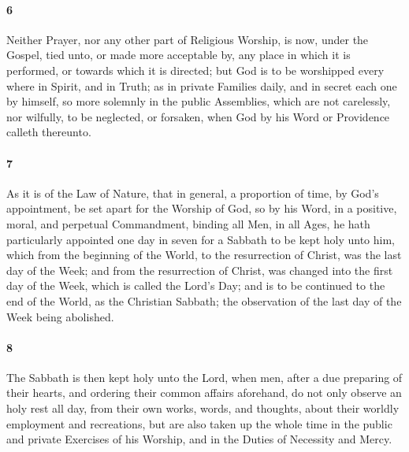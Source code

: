 \documentclass[
    paper=letterpaper,
    11pt,
    twoside,
    DIV=calc,
    openany
]{scrbook}
\newcommand{\oldgrammar}[2]{#2}
\begin{document}
\paragraph{6} %
Neither Prayer, nor any other part of Religious Worship, is now, under the Gospel, tied unto, or made more acceptable by, any place in which it is \R{}performed, or towards which it is directed; but God is to be worshipped every where in Spirit, and in Truth; as in \R{}private Families \R{}daily, and \R{}in secret each one by himself, so more solemnly in the public Assemblies, which are not carelessly, nor wilfully, to be \R{}neglected, or forsaken, when God by his Word or Providence calleth thereunto.

\footnotebegin
{}
\footnoteend

\paragraph{7} %
As it is of the Law of Nature, that in general, a proportion of time, by God’s appointment, be set apart for the Worship of God, so by his Word, in a positive, moral, and perpetual Commandment, binding all Men, in all Ages, he hath particularly appointed one day in seven for a \R{}Sabbath to be kept holy unto him, which from the beginning of the World, to the resurrection of Christ, was the last day of the Week; and from the resurrection of Christ, was changed into the first day of the Week, \R{}which is called the Lord’s Day; and is to be continued to the end of the World, as the Christian Sabbath; the observation of the last day of the Week being abolished.

\footnotebegin
{}
\footnoteend

\paragraph{8} %
The Sabbath is then kept holy unto the Lord, when men, after a due preparing of their hearts, and ordering their common affairs aforehand, do not only observe an holy \R{}rest all day, from their own works, words, and thoughts, about their worldly employment and recreations, but are also taken up the whole time in the \oldgrammar{publick}{public} and private Exercises of his Worship, and in the Duties \R{}of Necessity and Mercy.
\end{document}
